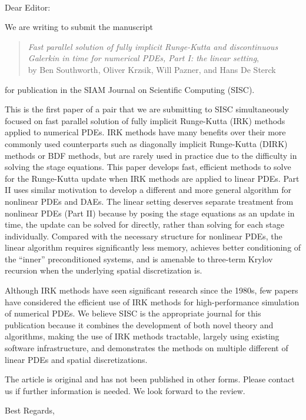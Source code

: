 \documentclass[12pt]{letter}
\date{}
\makeatletter
\renewcommand{\closing}[1]{\par\nobreak\vspace{\parskip}%
  \stopbreaks
  \noindent
  \ifx\@empty\fromaddress\else
  \hspace*{\longindentation}\fi
  \parbox{\indentedwidth}{\raggedright
       \ignorespaces #1\\[2\medskipamount]%
       \ifx\@empty\fromsig
           \fromname
       \else \fromsig \fi\strut}%
   \par}
\makeatother
\begin{document}
\vspace{-5ex}
\begin{letter}
\\
\opening{Dear Editor:}
\vspace{3ex}

We are writing to submit the manuscript
\begin{quote}
\emph{Fast parallel solution of fully implicit Runge-Kutta and discontinuous
  Galerkin in time for numerical PDEs, Part I: the linear setting},\\
by Ben Southworth, Oliver Krzsik, Will Pazner, and Hans De Sterck
\end{quote}
for publication in the SIAM Journal on Scientific Computing (SISC).

This is the first paper of a pair that we are submitting to SISC simultaneously
focused on fast parallel solution of fully implicit Runge-Kutta (IRK) methods applied
to numerical PDEs. IRK methods have many benefits over
their more commonly used counterparts such as diagonally implicit Runge-Kutta (DIRK)
methods or BDF methods, but are rarely used in practice due to the difficulty
in solving the stage equations. This paper develops fast, efficient methods to
solve for the Runge-Kutta update when IRK methods are applied to linear PDEs.
Part II uses similar motivation to develop a different and more general
algorithm for nonlinear PDEs and DAEs. The linear setting deserves separate treatment
from nonlinear PDEs (Part II) because by posing the stage equations as an
update in time, the update can be solved for directly, rather than solving for each
stage individually. Compared with the necessary structure for nonlinear
PDEs, the linear algorithm requires significantly less memory, achieves
better conditioning of the ``inner'' preconditioned systems, and is amenable
to three-term Krylov recursion when the underlying spatial discretization is.

Although IRK methods have seen significant research since the 1980s, few
papers have considered the efficient use of IRK methods for high-performance
simulation of numerical PDEs. We believe SISC is the appropriate journal for
this publication because it combines the development of both novel theory and
algorithms, making the use of IRK methods tractable, largely using existing
software infrastructure, and demonstrates the methods on multiple different
of linear PDEs and spatial discretizations.

The article is original and has not been published in other forms. Please
contact us if further information is needed. We look forward to the
review.\\

\closing{Best Regards,}


\end{letter}
\end{document}
